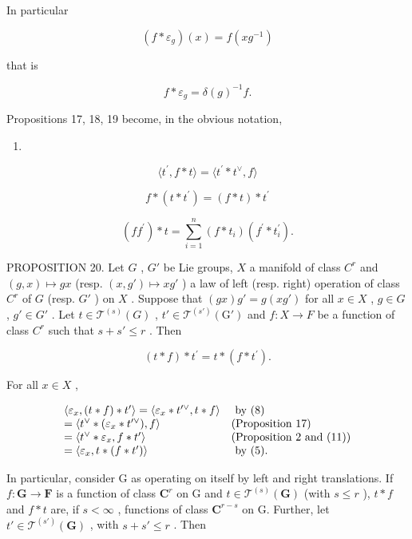 In particular

\[
(f * \varepsilon_ {g}) (x) = f (x g ^ {- 1})\tag{9}
\]

that is

\[
f * \varepsilon_ {g} = \delta (g) ^ {- 1} f.\tag{10}
\]

Propositions 17, 18, 19 become, in the obvious notation,

\begin{enumerate}
\def\labelenumi{(\arabic{enumi})}
\setcounter{enumi}{10}
\tightlist
\item
\end{enumerate}

\[
\langle t ^ {\prime}, f * t \rangle = \langle t ^ {\prime} * t ^ {\vee}, f \rangle\tag{11}
\]

\[
f * (t * t ^ {\prime}) = (f * t) * t ^ {\prime}\tag{12}
\]

\[
(f f ^ {\prime}) * t = \sum_ {i = 1} ^ {n} (f * t _ {i}) (f ^ {\prime} * t _ {i} ^ {\prime}).\tag{13}
\]

PROPOSITION 20. Let \(G\) , \(G'\) be Lie groups, \(X\) a manifold of class \(C^r\) and \((g, x) \mapsto gx\) (resp. \((x, g') \mapsto xg'\) ) a law of left (resp. right) operation of class \(C^r\) of \(G\) (resp. \(G'\) ) on \(X\) . Suppose that \((gx)g' = g(xg')\) for all \(x \in X\) , \(g \in G\) , \(g' \in G'\) . Let \(t \in \mathcal{T}^{(s)}(G)\) , \(t' \in \mathcal{T}^{(s')}(\mathrm{G}')\) and \(f: X \to F\) be a function of class \(C^r\) such that \(s + s' \leqslant r\) . Then

\[
(t * f) * t ^ {\prime} = t * (f * t ^ {\prime}).
\]

For all \(x \in X\) ,

\[
\begin{array}{l l} \langle \varepsilon_ {x}, (t * f) * t ^ {\prime} \rangle = \langle \varepsilon_ {x} * t ^ {\prime \vee}, t * f \rangle & \text { by   (8) } \\ = \langle t ^ {\vee} * (\varepsilon_ {x} * t ^ {\prime \vee}), f \rangle & \text {(Proposition 17)} \\ = \langle t ^ {\vee} * \varepsilon_ {x}, f * t ^ {\prime} \rangle & \text {(Proposition 2 and (11))} \\ = \langle \varepsilon_ {x}, t * (f * t ^ {\prime}) \rangle & \text { by   (5). } \end{array}
\]

In particular, consider G as operating on itself by left and right translations. If \(f \colon \mathbf{G} \to \mathbf{F}\) is a function of class \(\mathbf{C}^r\) on G and \(t \in \mathcal{T}^{(s)}(\mathbf{G})\) (with \(s \leqslant r\) ), \(t * f\) and \(f * t\) are, if \(s < \infty\) , functions of class \(\mathbf{C}^{r - s}\) on G. Further, let \(t' \in \mathcal{T}^{(s')}(\mathbf{G})\) , with \(s + s' \leqslant r\) . Then

